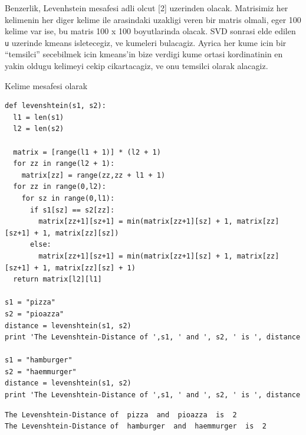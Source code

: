 \documentclass[12pt,fleqn]{article}\usepackage{../common}
\begin{document}
Benzerlik, Levenhstein mesafesi adli olcut [2] uzerinden olacak. Matrisimiz
her kelimenin her diger kelime ile arasindaki uzakligi veren bir matris
olmali, eger 100 kelime var ise, bu matris 100 x 100 boyutlarinda
olacak. SVD sonrasi elde edilen \verb!u! uzerinde kmeans isletecegiz, ve
kumeleri bulacagiz. Ayrica her kume icin bir ``temsilci'' secebilmek icin
kmeans'in bize verdigi kume ortasi kordinatinin en yakin oldugu kelimeyi
cekip cikartacagiz, ve onu temsilci olarak alacagiz.

Kelime mesafesi olarak

\begin{verbatim}
def levenshtein(s1, s2):
  l1 = len(s1)
  l2 = len(s2)

  matrix = [range(l1 + 1)] * (l2 + 1)
  for zz in range(l2 + 1):
    matrix[zz] = range(zz,zz + l1 + 1)
  for zz in range(0,l2):
    for sz in range(0,l1):
      if s1[sz] == s2[zz]:
        matrix[zz+1][sz+1] = min(matrix[zz+1][sz] + 1, matrix[zz][sz+1] + 1, matrix[zz][sz])
      else:
        matrix[zz+1][sz+1] = min(matrix[zz+1][sz] + 1, matrix[zz][sz+1] + 1, matrix[zz][sz] + 1)
  return matrix[l2][l1]

s1 = "pizza"
s2 = "pioazza"   
distance = levenshtein(s1, s2)       
print 'The Levenshtein-Distance of ',s1, ' and ', s2, ' is ', distance

s1 = "hamburger"
s2 = "haemmurger"   
distance = levenshtein(s1, s2)       
print 'The Levenshtein-Distance of ',s1, ' and ', s2, ' is ', distance
\end{verbatim}

\begin{verbatim}
The Levenshtein-Distance of  pizza  and  pioazza  is  2
The Levenshtein-Distance of  hamburger  and  haemmurger  is  2
\end{verbatim}
\end{document}
